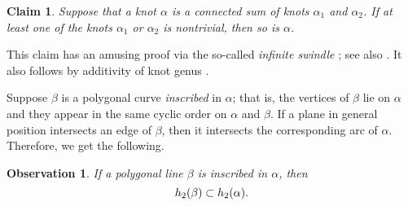 \documentclass{article}
\newcommand*{\z}[1]{#1\nobreak\discretionary{}%
            {\hbox{$\mathsurround=0pt #1$}}{}}
\theoremstyle{theorem}
\newtheorem{Crofton-type formula}[theorem]{Crofton-type formula}
\newtheorem{Douglas--Rado theorem}[theorem]{\arXiv{Douglas--Rado theorem}{Theorem}}
\newtheorem{Extended monotonicity theorem}[theorem]{\arXiv{Extended monotonicity theorem}{Theorem}}
\newtheorem{Claim}[theorem]{Claim}
\newtheorem{Observation}[theorem]{Observation}
\theoremstyle{definition}
\begin{document}
\begin{Claim}\label{clm:connected-sum}
Suppose that a knot $\alpha$ is a connected sum of knots $\alpha_1$ and $\alpha_2$.
If at least one of the knots $\alpha_1$ or $\alpha_2$ is nontrivial, then so is $\alpha$.
\end{Claim}

This claim has an amusing proof via the so-called \emph{infinite swindle} \cite{mazur}; see also \cite{poenaru}.
It also follows by additivity of knot genus \cite[Section 4.3]{adams}.

Suppose $\beta$ is a polygonal curve \emph{inscribed} in $\alpha$;
that is, the vertices of $\beta$ lie on $\alpha$ and they appear in the same cyclic order on $\alpha$ and $\beta$.
If a plane in general position intersects an edge of $\beta$, then it intersects
the corresponding arc of $\alpha$. %
Therefore, we get the following.

\begin{Observation}
If a polygonal line $\beta$ is inscribed in $\alpha$, then 
\[h_2(\beta)\z\subset h_2(\alpha).\]
\end{Observation}
\end{document}
